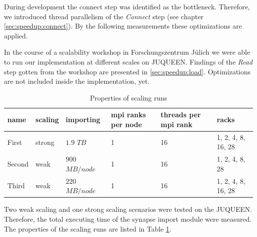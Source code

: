 \newpage
During development the connect step was identified as the bottleneck.
Therefore, we introduced thread parallelism of the \emph{Connect} step (see chapter \ref{sec:speedup:connect}).
By the following measurements these optimizations are applied.

In the course of a scalability workshop in Forschungszentrum J\"{u}lich we were able to run
our implementation at different scales on JUQUEEN.
Findings of the \emph{Read} step gotten from the workshop are presented in \ref{sec:speedup:load}.
Optimizations are not included inside the implementation, yet.
\begin{table}[ht!]
\begin{center}
\begin{tabular}{|l|l|l|p{1.9cm}|p{2.1cm}|l|}
\hline
name & scaling & importing & mpi ranks per node & threads per mpi rank & racks \\
\hline\hline
First    &  strong  & $1.9$ $TB$             & 1 & 16 & 1, 2, 4, 8, 16, 28 \\
Second    &  weak  & $900$ $MB/node$      & 1 & 16 & 1, 2, 4, 8, 28 \\
Third    &  weak  & $220$ $MB/node$     & 1 & 16 & 1, 2, 4, 8, 16, 28 \\
\hline
\end{tabular}
\end{center}
\caption{Properties of scaling runs}
\label{schumann:tbl:runs}
\end{table}

Two weak scaling and one strong scaling scenarios were tested on the JUQUEEN.
Therefore, the total executing time of the synapse import module were measured.
The properties of the scaling runs are listed in Table \ref{schumann:tbl:runs}.


